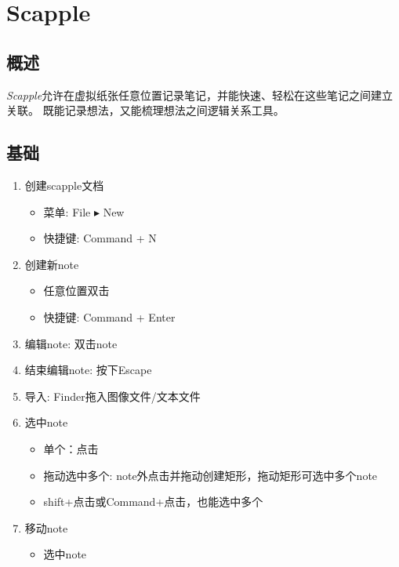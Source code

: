 \documentclass{../main.tex}{subfiles}
\begin{document}
\chapter{Scapple}
\section{概述}
\emph{Scapple}允许在虚拟纸张任意位置记录笔记，并能快速、轻松在这些笔记之间建立关联。
既能记录想法，又能梳理想法之间逻辑关系工具。

\section{基础}
\begin{enumerate}[itemsep=0pt, parsep=0pt, topsep=0pt, partopsep=0pt]
  \item 创建scapple文档
      \begin{itemize}[itemsep=0pt, parsep=0pt, topsep=0pt, partopsep=0pt]
        \item 菜单: File $\blacktriangleright$ New
        \item 快捷键: Command + N
      \end{itemize}
  \item 创建新note
      \begin{itemize}[itemsep=0pt, parsep=0pt, topsep=0pt, partopsep=0pt]
        \item 任意位置双击
        \item 快捷键: Command + Enter
      \end{itemize}
  \item 编辑note: 双击note
  \item 结束编辑note: 按下Escape
  \item 导入: Finder拖入图像文件/文本文件
  \item 选中note
      \begin{itemize}[itemsep=0pt, parsep=0pt, topsep=0pt, partopsep=0pt]
        \item 单个：点击
        \item 拖动选中多个: note外点击并拖动创建矩形，拖动矩形可选中多个note
        \item shift+点击或Command+点击，也能选中多个
      \end{itemize}
  \item 移动note
      \begin{itemize}[itemsep=0pt, parsep=0pt, topsep=0pt, partopsep=0pt]
        \item 选中note

\end{itemize}
\end{enumerate}
\end{document}
